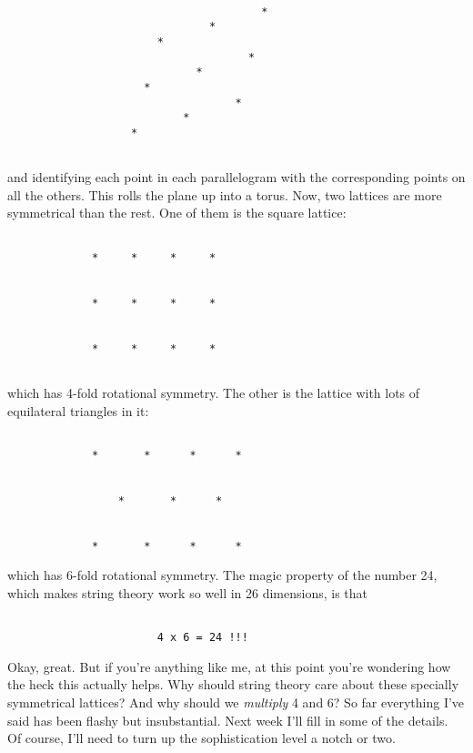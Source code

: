 \begin{verbatim}

                                       *
                               *
                       * 
                                     *
                             *
                     *    
                                   *
                           *
                   *
             
\end{verbatim}
    
and identifying each point in each parallelogram with the corresponding
points on all the others.   This rolls the plane up into a torus.  Now,
two lattices are more symmetrical than the rest.   One of them is the
square lattice:


\begin{verbatim}

             *     *     *     *


             *     *     *     *


             *     *     *     *
         
\end{verbatim}
    
which has 4-fold rotational symmetry.   The other is the lattice with
lots of equilateral triangles in it:



\begin{verbatim}

             *       *      *      *


                 *       *      *                


             *       *      *      *

\end{verbatim}
    
which has 6-fold rotational symmetry.  The magic property of the number
24, which makes string theory work so well in 26 dimensions, is that 


\begin{verbatim}

                       4 x 6 = 24 !!!
\end{verbatim}
    
Okay, great.  But if you're anything like me, at this point you're
wondering how the heck this actually helps.  Why should string theory
care about these specially symmetrical lattices?  And why should we
\emph{multiply} 4 and 6?  So far everything I've said has been flashy but
insubstantial.  Next week I'll fill in some of the details.  Of course,
I'll need to turn up the sophistication level a notch or two.  

